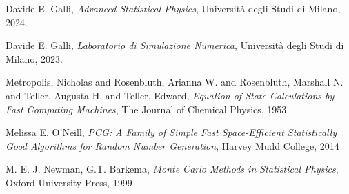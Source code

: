 \begin{thebibliography}{9}
     Davide E. Galli, \textit{Advanced Statistical Physics}, Università degli Studi di Milano, 2024.

     Davide E. Galli, \textit{Laboratorio di Simulazione Numerica}, Università degli Studi di Milano, 2023.

     Metropolis, Nicholas and Rosenbluth, Arianna W. and Rosenbluth, Marshall N. and Teller, Augusta H. and Teller, Edward,
    \textit{Equation of State Calculations by Fast Computing Machines}, The Journal of Chemical Physics, 1953

     Melissa E. O'Neill, \textit{PCG: A Family of Simple Fast Space-Efficient Statistically Good Algorithms for Random Number Generation}, 
    Harvey Mudd College, 2014

     M. E. J. Newman, G.T. Barkema, \textit{Monte Carlo Methods in Statistical Physics}, Oxford University Press, 1999

\end{thebibliography}